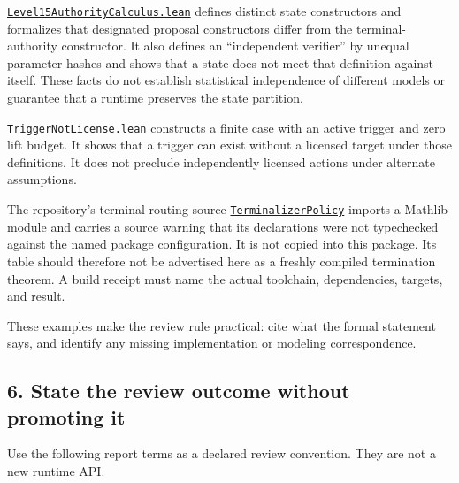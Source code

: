 \documentclass[
  11pt,
]{article}
\newcommand{\passthrough}[1]{#1}
\begin{document}
\href{https://github.com/dbccpage/the_symbol_game/blob/52cb5457f6c485ba548cfd292f6012a941ed22cf/omega_engine_atlas/coda_atlas/omega_engine_symbol_game/009_pfp_adversarial_dialectics_and_terminal_reality_gates/lean4/Level15AuthorityCalculus.lean}{\mbox{\nolinkurl{Level15AuthorityCalculus.lean}}}
defines distinct state constructors and formalizes that designated
proposal constructors differ from the terminal-authority constructor. It
also defines an ``independent verifier'' by unequal parameter hashes and
shows that a state does not meet that definition against itself. These
facts do not establish statistical independence of different models or
guarantee that a runtime preserves the state partition.

\href{https://github.com/dbccpage/the_symbol_game/blob/52cb5457f6c485ba548cfd292f6012a941ed22cf/omega_engine_atlas/coda_atlas/omega_engine_symbol_game/009_pfp_adversarial_dialectics_and_terminal_reality_gates/lean4/TriggerNotLicense.lean}{\mbox{\nolinkurl{TriggerNotLicense.lean}}}
constructs a finite case with an active trigger and zero lift budget. It
shows that a trigger can exist without a licensed target under those
definitions. It does not preclude independently licensed actions under
alternate assumptions.

The repository's terminal-routing source
\href{https://github.com/dbccpage/the_symbol_game/blob/52cb5457f6c485ba548cfd292f6012a941ed22cf/lean4/TerminalizerPolicy.lean}{\passthrough{\lstinline!TerminalizerPolicy!}}
imports a Mathlib module and carries a source warning that its
declarations were not typechecked against the named package
configuration. It is not copied into this package. Its table should
therefore not be advertised here as a freshly compiled termination
theorem. A build receipt must name the actual toolchain, dependencies,
targets, and result.

These examples make the review rule practical: cite what the formal
statement says, and identify any missing implementation or modeling
correspondence.

\subsection{6. State the review outcome without promoting
it}\label{state-the-review-outcome-without-promoting-it}

Use the following report terms as a declared review convention. They are
not a new runtime API.
\end{document}

